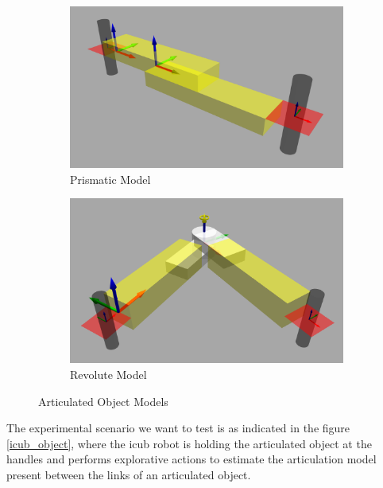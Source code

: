 \documentclass[12pt,a4paper]{report}
\begin{document}
\begin{figure}[H]
	\begin{subfigure}[b]{0.5\textwidth}
		\centering
		\includegraphics[scale=0.15]{figures/1p_2link.png}
		\caption{Prismatic Model}
		\label{pmodel}
	\end{subfigure}
	\begin{subfigure}[b]{0.5\textwidth}
		\centering
		\includegraphics[scale=0.16]{figures/1r_2link.png}
		\caption{Revolute Model}
		\label{rmodel}
	\end{subfigure}
	\caption{Articulated Object Models}
	\label{icub_mani}
\end{figure}

The experimental scenario we want to test is as indicated in the figure \ref{icub_object}, where the icub robot is holding the articulated object at the handles and performs explorative actions to estimate the
articulation model present between the links of an articulated object.
\end{document}
